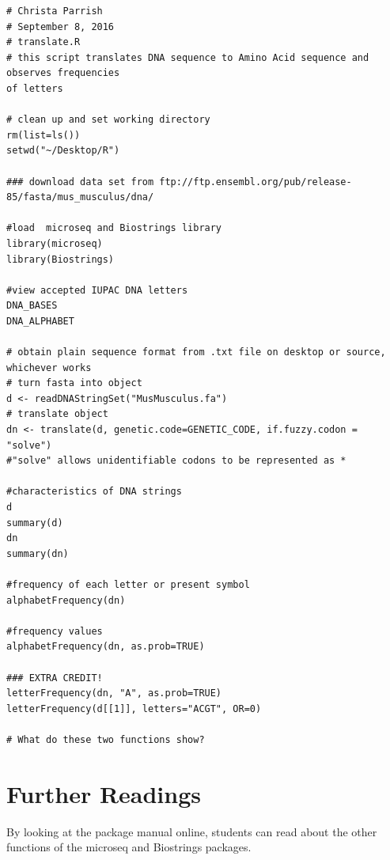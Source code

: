 \begin{lstlisting}
# Christa Parrish
# September 8, 2016
# translate.R
# this script translates DNA sequence to Amino Acid sequence and observes frequencies 
of letters

# clean up and set working directory
rm(list=ls())
setwd("~/Desktop/R")

### download data set from ftp://ftp.ensembl.org/pub/release-85/fasta/mus_musculus/dna/

#load  microseq and Biostrings library
library(microseq)
library(Biostrings)

#view accepted IUPAC DNA letters
DNA_BASES
DNA_ALPHABET

# obtain plain sequence format from .txt file on desktop or source, whichever works
# turn fasta into object
d <- readDNAStringSet("MusMusculus.fa")
# translate object
dn <- translate(d, genetic.code=GENETIC_CODE, if.fuzzy.codon = "solve") 
#"solve" allows unidentifiable codons to be represented as *

#characteristics of DNA strings
d
summary(d)
dn
summary(dn)

#frequency of each letter or present symbol
alphabetFrequency(dn)

#frequency values
alphabetFrequency(dn, as.prob=TRUE)

### EXTRA CREDIT!
letterFrequency(dn, "A", as.prob=TRUE)
letterFrequency(d[[1]], letters="ACGT", OR=0)

# What do these two functions show?
\end{lstlisting}


\section{Further Readings}

By looking at the package manual online, students can read about the other functions of the microseq and Biostrings packages.

\printnomenclature
